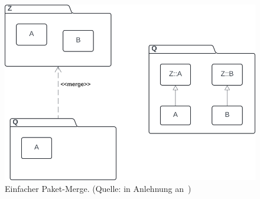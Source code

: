 \begin{figure}
    \centering
    \includegraphics[scale=0.4]{part three/Klassendiagramme - Erweiterte Konzepte und Paketdiagramme/img/import-merge}
    \caption{Einfacher Paket-Merge. (Quelle: in Anlehnung an~\cite[308, Abb. 6.8-4]{Bal05})}
    \label{fig:import-merge}
\end{figure}
